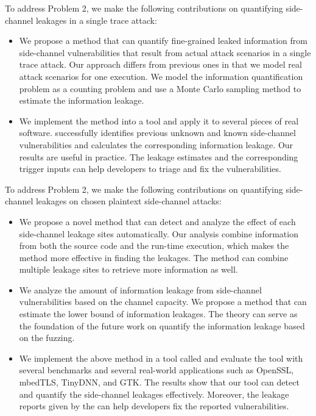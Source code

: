 To address Problem 2, we make the following contributions on quantifying side-channel leakages in a single trace attack:


\begin{itemize}
    \item We propose a method that can quantify fine-grained leaked
    information from side-channel vulnerabilities that result from actual attack
    scenarios in a single trace attack. Our approach differs from previous ones in that we
    model real attack scenarios for one execution. 
    We model the information quantification problem as a counting problem 
    and use a Monte Carlo sampling method to estimate the information leakage.
    \item We implement the method into a tool and apply it
    to several pieces of real software. \tool{} successfully identifies
    previous unknown and known side-channel vulnerabilities and calculates the corresponding information leakage. 
    Our results are useful in practice.
    The leakage estimates and the corresponding trigger inputs can 
    help developers to triage and fix the vulnerabilities.
\end{itemize}

To address Problem 2, we make the following contributions on quantifying side-channel leakages on chosen plaintext side-channel attacks: 
\begin{itemize}
    \item We propose a novel method that can detect and analyze the effect of each side-channel leakage sites automatically. Our analysis combine information from both the source code and the run-time execution, which makes the method more effective in finding the leakages. The method can combine multiple leakage sites to retrieve more information as well.
    \item We analyze the amount of information leakage from side-channel vulnerabilities based on the channel capacity. We propose a method that can estimate the lower bound of information leakages. The theory can serve as the foundation of the future work on quantify the information leakage based on the fuzzing.
    \item We implement the above method in a tool called \ctool{} and evaluate the tool with several benchmarks and several real-world applications such as OpenSSL, mbedTLS, TinyDNN, and GTK. The results show that our tool can detect and quantify the side-channel leakages effectively. Moreover, the leakage reports given by the \ctool{} can help developers fix the reported vulnerabilities.
\end{itemize}


